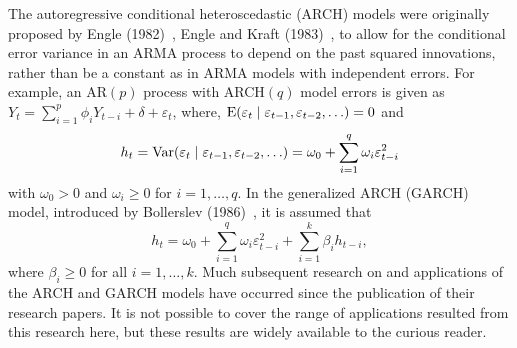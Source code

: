 The autoregressive conditional heteroscedastic (ARCH) models were originally proposed by Engle (1982)~\cite{engle1982}, Engle and Kraft (1983)~\cite{engle1983}, to allow for the conditional error variance in an ARMA process to depend on the past squared innovations, rather than be a constant as in ARMA models with independent errors. For example, an AR$(p)$ process with ARCH$(q)$ model errors is given as $Y_t = \sum_{i=1}^p\phi_iY_{t-i} + \delta + \varepsilon_t$, where, $\operatorname{E}(\varepsilon_t \;|\; \varepsilon_{t-1},\varepsilon_{t-2},\ldots)= 0$ and
	\begin{equation} \label{eqn:2ht}
	h_t= \var(\varepsilon_t \;|\; \varepsilon_{t-1}, \varepsilon_{t-2}, \ldots) = \omega_0 + \sum_{i=1}^q \omega_i \varepsilon_{t-i}^2
	\end{equation}
with $\omega_0 > 0$ and $\omega_i \geq 0$ for $i= 1, \ldots, q$. In the generalized ARCH (GARCH) model, introduced by Bollerslev (1986)~\cite{bollerslev1986}, it is assumed that
	\begin{equation} \label{eqn:2secondht}
	h_t = \omega_0 + \sum_{i=1}^q \omega_i \varepsilon_{t-i}^2 + \sum_{i=1}^k \beta_i h_{t-i},
	\end{equation}
where $\beta_i \geq 0$ for all $i = 1,\ldots,k$. Much subsequent research on and applications of the ARCH and GARCH models have occurred since the publication of their research papers. It is not possible to cover the range of applications resulted from this research here, but these results are widely available to the curious reader.


